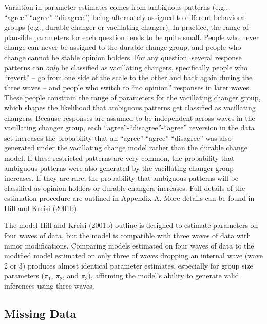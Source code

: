 \documentclass[12pt,]{article}
\begin{document}
Variation in parameter estimates comes from ambiguous patterns (e.g., ``agree''-``agree''-``disagree'') being alternately assigned to different behavioral groups (e.g., durable changer or vacillating changer). In practice, the range of plausible parameters for each question tends to be quite small. People who never change can never be assigned to the durable change group, and people who change cannot be stable opinion holders. For any question, several response patterns can \emph{only} be classified as vacillating changers, specifically people who ``revert'' -- go from one side of the scale to the other and back again during the three waves -- and people who switch to ``no opinion'' responses in later waves. These people constrain the range of parameters for the vacillating changer group, which shapes the likelihood that ambiguous patterns get classified as vacillating changers. Because responses are assumed to be independent across waves in the vacillating changer group, each ``agree''-``disagree''-``agree'' reversion in the data set increases the probability that an ``agree''-``agree''-``disagree'' was also generated under the vacillating change model rather than the durable change model. If these restricted patterns are very common, the probability that ambiguous patterns were also generated by the vacillating changer group increases. If they are rare, the probability that ambiguous patterns will be classified as opinion holders or durable changers increases. Full details of the estimation procedure are outlined in Appendix A. More details can be found in Hill and Kreisi (2001b).

The model Hill and Kreisi (2001b) outline is designed to estimate parameters on four waves of data, but the model is compatible with three waves of data with minor modifications. Comparing models estimated on four waves of data to the modified model estimated on only three of waves dropping an internal wave (wave 2 or 3) produces almost identical parameter estimates, especially for group size parameters (\(\pi_1\), \(\pi_2\), and \(\pi_3\)), affirming the model's ability to generate valid inferences using three waves.

\hypertarget{missing-data}{%
\subsection{Missing Data}\label{missing-data}}
\end{document}
